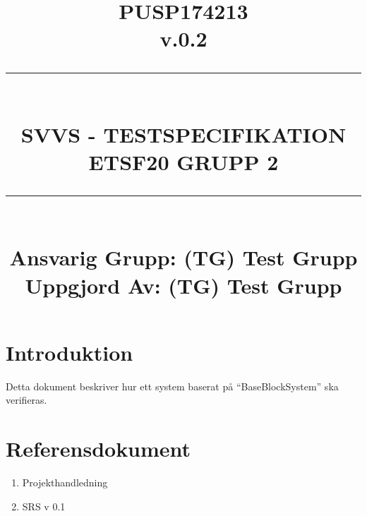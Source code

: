 \documentclass[paper=a4, fontsize=11pt,twoside]{article}
\title{
		\documentNumber{#1}																						
		\documentVersion{#2}																				
		\HRule{0.5pt} \\ %
		\LARGE \textbf{\uppercase{#3}} \\
		\large \textbf{\uppercase{ETSF20 Grupp 2}} 
		\HRule{2pt} \\ [1.5cm]    
		\normalsize            
		\documentResponsible{#4} \\ 
		\documentCreator{#4}  
	}
\newcommand{\HRule}[1]{\rule{\linewidth}{#1}}
\newcommand{\documentNumber}[1]{\centering PUSP1742#1 \\[1.0cm]}
\newcommand{\documentVersion}[1]{\centering \small{v.#1} \\[1.0cm]}
\newcommand{\documentResponsible}[1]{\centering  Ansvarig Grupp: #1}
\newcommand{\documentCreator}[1]{\centering Uppgjord Av: #1}
\newcommand{\grouptitlepage}[4]{ 
	\title{
		\documentNumber{#1}																						
		\documentVersion{#2}																				
		\HRule{0.5pt} \\ %
		\LARGE \textbf{\uppercase{#3}} \\
		\large \textbf{\uppercase{ETSF20 Grupp 2}} 
		\HRule{2pt} \\ [1.5cm]    
		\normalsize            
		\documentResponsible{#4} \\ 
		\documentCreator{#4}  
	}																							
	\maketitle																							
	\thispagestyle{empty} 																					
	\newpage 
}
\begin{document}
\grouptitlepage
{13}
{0.2}
{SVVS - Testspecifikation}
{(TG) Test Grupp} %
\tableofcontents
\section{Introduktion}

 Detta dokument beskriver hur ett system baserat på “BaseBlockSystem”
 ska verifieras.
 

\section{Referensdokument}

\begin{enumerate}
\item Projekthandledning
\item SRS v 0.1
\end{enumerate}
\end{document}
